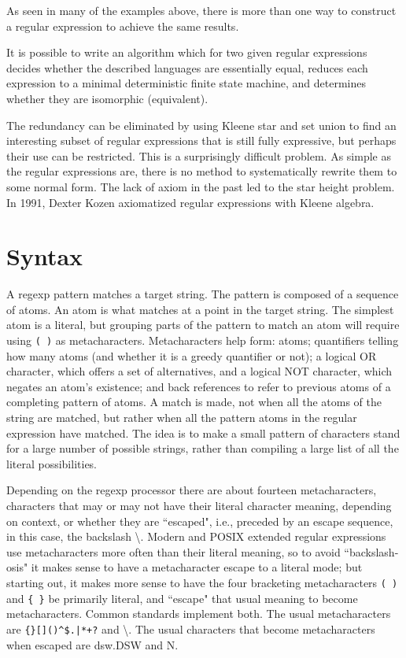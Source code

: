 As seen in many of the examples above, there is more than one way to construct a regular expression to achieve the same results.

It is possible to write an algorithm which for two given regular expressions decides whether the described languages are essentially equal, reduces each expression to a minimal deterministic finite state machine, and determines whether they are isomorphic (equivalent).

The redundancy can be eliminated by using Kleene star and set union to find an interesting subset of regular expressions that is still fully expressive, but perhaps their use can be restricted. This is a surprisingly difficult problem. As simple as the regular expressions are, there is no method to systematically rewrite them to some normal form. The lack of axiom in the past led to the star height problem. In 1991, Dexter Kozen axiomatized regular expressions with Kleene algebra.



\chapter{Syntax}
\label{regular_expression_syntax}


A regexp pattern matches a target string. The pattern is composed of a sequence of atoms. An atom is what matches at a point in the target string. The simplest atom is a literal, but grouping parts of the pattern to match an atom will require using \texttt{( )} as metacharacters. Metacharacters help form: atoms; quantifiers telling how many atoms (and whether it is a greedy quantifier or not); a logical OR character, which offers a set of alternatives, and a logical NOT character, which negates an atom's existence; and back references to refer to previous atoms of a completing pattern of atoms. A match is made, not when all the atoms of the string are matched, but rather when all the pattern atoms in the regular expression have matched. The idea is to make a small pattern of characters stand for a large number of possible strings, rather than compiling a large list of all the literal possibilities.

Depending on the regexp processor there are about fourteen metacharacters, characters that may or may not have their literal character meaning, depending on context, or whether they are ``escaped", i.e., preceded by an escape sequence, in this case, the backslash \textbackslash. Modern and POSIX extended regular expressions use metacharacters more often than their literal meaning, so to avoid ``backslash-osis" it makes sense to have a metacharacter escape to a literal mode; but starting out, it makes more sense to have the four bracketing metacharacters \texttt{( )} and \texttt{\{ \}} be primarily literal, and ``escape" that usual meaning to become metacharacters. Common standards implement both. The usual metacharacters are \texttt{\{\}[]()\^{}\$.|*+?} and \textbackslash. The usual characters that become metacharacters when escaped are dsw.DSW and N.



